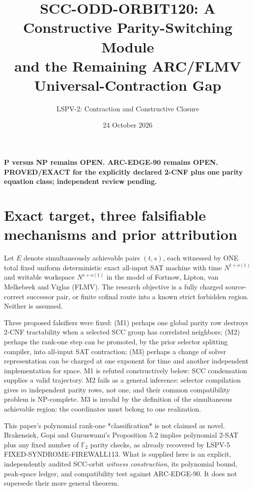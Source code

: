 \documentclass[11pt]{article}
\title{SCC-ODD-ORBIT120: A Constructive Parity-Switching Module\\and the Remaining ARC/FLMV Universal-Contraction Gap}
\author{LSPV-2: Contraction and Constructive Closure}
\date{24 October 2026}
\begin{document}
\maketitle
\begin{center}\textbf{P versus NP remains OPEN. ARC-EDGE-90 remains OPEN.}\\
\textbf{PROVED/EXACT for the explicitly declared 2-CNF plus one parity equation class; independent review pending.}\end{center}
\section{Exact target, three falsifiable mechanisms and prior attribution}
Let $E$ denote simultaneously achievable pairs $(t,s)$, each witnessed by ONE total fixed uniform deterministic exact all-input SAT machine with time $N^{t+o(1)}$ and writable workspace $N^{s+o(1)}$ in the model of Fortnow, Lipton, van Melkebeek and Viglas (FLMV). The research objective is a fully charged source-correct successor pair, or finite cofinal route into a known strict forbidden region. Neither is assumed.

Three proposed falsifiers were fixed: (M1) perhaps one global parity row destroys 2-CNF tractability when a selected SCC group has correlated neighbors; (M2) perhaps the rank-one step can be promoted, by the prior selector splitting compiler, into all-input SAT contraction; (M3) perhaps a change of solver representation can be charged at one exponent for time and another independent implementation for space. M1 is refuted constructively below: SCC condensation supplies a valid trajectory. M2 fails as a general inference: selector compilation gives $m$ independent parity rows, not one, and their common compatibility problem is NP-complete. M3 is invalid by the definition of the simultaneous achievable region: the coordinates must belong to one realization.

This paper's polynomial rank-one *classification* is not claimed as novel. Brakensiek, Gopi and Guruswami's Proposition 5.2 implies polynomial 2-SAT plus any fixed number of $\mathbb F_2$ parity checks, as already recovered by LSPV-5 FIXED-SYNDROME-FIREWALL113. What is supplied here is an explicit, independently audited SCC-orbit \emph{witness construction}, its polynomial bound, peak-space ledger, and compatibility test against ARC-EDGE-90. It does not supersede their more general theorem.
\end{document}
